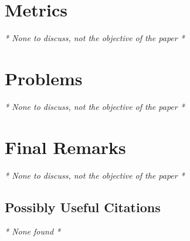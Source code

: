\documentclass{Paper_Summary}
\begin{document}
\section{Metrics}
\emph{* None to discuss, not the objective of the paper *}

\section{Problems}
\emph{* None to discuss, not the objective of the paper *}


\section{Final Remarks}
\emph{* None to discuss, not the objective of the paper *}

\breakline

\begin{center}
    \section*{Possibly Useful Citations}
\end{center}
\emph{* None found *}
\end{document}
